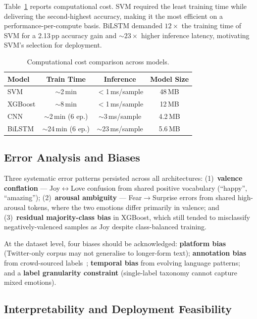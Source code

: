 Table~\ref{tab:compute} reports computational cost. SVM required the least training time while delivering the second-highest accuracy, making it the most efficient on a performance-per-compute basis. BiLSTM demanded $12\times$ the training time of SVM for a 2.13\,pp accuracy gain and ${\sim}23\times$ higher inference latency, motivating SVM's selection for deployment.

\begin{table}[!htb]
\centering
\caption{Computational cost comparison across models.}
\label{tab:compute}
\small
\begin{tabular}{@{}lccc@{}}
\toprule
\textbf{Model} & \textbf{Train Time} & \textbf{Inference} & \textbf{Model Size} \\
\midrule
SVM      & $\sim$2\,min  & $<$1\,ms/sample  & 48\,MB \\
XGBoost  & $\sim$8\,min  & $<$1\,ms/sample  & 12\,MB \\
CNN      & $\sim$2\,min (6 ep.) & $\sim$3\,ms/sample & 4.2\,MB \\
BiLSTM   & $\sim$24\,min (6 ep.) & $\sim$23\,ms/sample & 5.6\,MB \\
\bottomrule
\end{tabular}
\end{table}

\subsection{Error Analysis and Biases}

Three systematic error patterns persisted across all architectures: (1)~\textbf{valence conflation} --- Joy$\leftrightarrow$Love confusion from shared positive vocabulary (``happy'', ``amazing''); (2)~\textbf{arousal ambiguity} --- Fear$\rightarrow$Surprise errors from shared high-arousal tokens, where the two emotions differ primarily in valence; and (3)~\textbf{residual majority-class bias} in XGBoost, which still tended to misclassify negatively-valenced samples as Joy despite class-balanced training.

At the dataset level, four biases should be acknowledged: \textbf{platform bias} (Twitter-only corpus may not generalise to longer-form text); \textbf{annotation bias} from crowd-sourced labels~\citep{demszky2020goemotions}; \textbf{temporal bias} from evolving language patterns; and a \textbf{label granularity constraint} (single-label taxonomy cannot capture mixed emotions).

\subsection{Interpretability and Deployment Feasibility}

